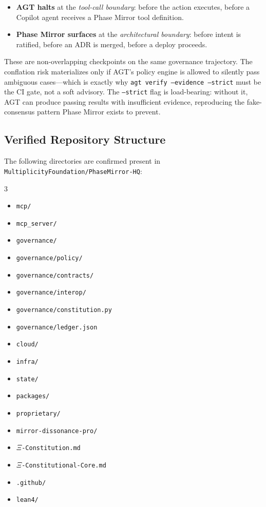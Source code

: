 \documentclass[12pt,a4paper]{article}
\theoremstyle{definition}
\theoremstyle{remark}
\begin{document}
\begin{itemize}
  \item \textbf{AGT halts} at the \emph{tool-call boundary}: before the action
    executes, before a Copilot agent receives a Phase Mirror tool definition.
  \item \textbf{Phase Mirror surfaces} at the \emph{architectural boundary}:
    before intent is ratified, before an ADR is merged, before a deploy proceeds.
\end{itemize}

These are non-overlapping checkpoints on the same governance trajectory.
The conflation risk materializes only if AGT's policy engine is allowed to
silently pass ambiguous cases---which is exactly why
\texttt{agt verify --evidence --strict} must be the CI gate, not a soft advisory.
The \texttt{--strict} flag is load-bearing: without it, AGT can produce passing
results with insufficient evidence, reproducing the fake-consensus pattern
Phase Mirror exists to prevent.

\subsection{Verified Repository Structure}

The following directories are confirmed present in
\texttt{MultiplicityFoundation/PhaseMirror-HQ}:

\begin{multicols}{3}
\begin{itemize}[leftmargin=1em,noitemsep]
  \item \texttt{mcp/}
  \item \texttt{mcp\_server/}
  \item \texttt{governance/}
  \item \texttt{governance/policy/}
  \item \texttt{governance/contracts/}
  \item \texttt{governance/interop/}
  \item \texttt{governance/constitution.py}
  \item \texttt{governance/ledger.json}
  \item \texttt{cloud/}
  \item \texttt{infra/}
  \item \texttt{state/}
  \item \texttt{packages/}
  \item \texttt{proprietary/}
  \item \texttt{mirror-dissonance-pro/}
  \item \texttt{$\Xi$-Constitution.md}
  \item \texttt{$\Xi$-Constitutional-Core.md}
  \item \texttt{.github/}
  \item \texttt{lean4/}
\end{itemize}
\end{multicols}
\end{document}
